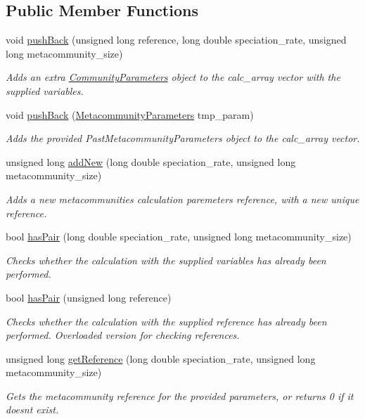 \subsection*{Public Member Functions}
\begin{DoxyCompactItemize}
\item 
void \hyperlink{struct_metacommunities_array_a581a404fb39d14256419d9ae1118f58b}{push\+Back} (unsigned long reference, long double speciation\+\_\+rate, unsigned long metacommunity\+\_\+size)
\begin{DoxyCompactList}\small\item\em Adds an extra \hyperlink{struct_community_parameters}{Community\+Parameters} object to the calc\+\_\+array vector with the supplied variables. \end{DoxyCompactList}\item 
void \hyperlink{struct_metacommunities_array_aafc6f9ba63be4c85d32d86ebfd2137e3}{push\+Back} (\hyperlink{struct_metacommunity_parameters}{Metacommunity\+Parameters} tmp\+\_\+param)
\begin{DoxyCompactList}\small\item\em Adds the provided Past\+Metacommunity\+Parameters object to the calc\+\_\+array vector. \end{DoxyCompactList}\item 
unsigned long \hyperlink{struct_metacommunities_array_a2fef78ac6dea9d8297a7fd3b72f3026c}{add\+New} (long double speciation\+\_\+rate, unsigned long metacommunity\+\_\+size)
\begin{DoxyCompactList}\small\item\em Adds a new metacommunities calculation paremeters reference, with a new unique reference. \end{DoxyCompactList}\item 
bool \hyperlink{struct_metacommunities_array_a8ef151569615b4091807aa8c50ebf1b2}{has\+Pair} (long double speciation\+\_\+rate, unsigned long metacommunity\+\_\+size)
\begin{DoxyCompactList}\small\item\em Checks whether the calculation with the supplied variables has already been performed. \end{DoxyCompactList}\item 
bool \hyperlink{struct_metacommunities_array_a98876103779bab91793f6daa513722d6}{has\+Pair} (unsigned long reference)
\begin{DoxyCompactList}\small\item\em Checks whether the calculation with the supplied reference has already been performed. Overloaded version for checking references. \end{DoxyCompactList}\item 
unsigned long \hyperlink{struct_metacommunities_array_a5c15d164bc32cd2731c9382fe3fbbfbe}{get\+Reference} (long double speciation\+\_\+rate, unsigned long metacommunity\+\_\+size)
\begin{DoxyCompactList}\small\item\em Gets the metacommunity reference for the provided parameters, or returns 0 if it doesn\textquotesingle{}t exist. \end{DoxyCompactList}\end{DoxyCompactItemize}
